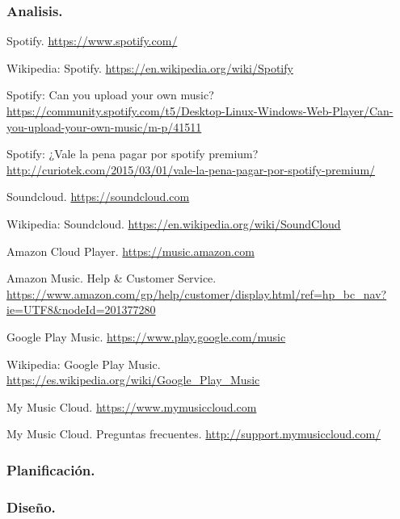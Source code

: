 \subsubsection*{Analisis.}

 Spotify. \url{https://www.spotify.com/}

 Wikipedia: Spotify. \url{https://en.wikipedia.org/wiki/Spotify}

 Spotify: Can you upload your own music? \url{https://community.spotify.com/t5/Desktop-Linux-Windows-Web-Player/Can-you-upload-your-own-music/m-p/41511}

 Spotify: ¿Vale la pena pagar por spotify premium? \url{http://curiotek.com/2015/03/01/vale-la-pena-pagar-por-spotify-premium/}

 Soundcloud. \url{https://soundcloud.com}

 Wikipedia: Soundcloud. \url{https://en.wikipedia.org/wiki/SoundCloud}

 Amazon Cloud Player. \url{https://music.amazon.com}

 Amazon Music. Help & Customer Service. \url{https://www.amazon.com/gp/help/customer/display.html/ref=hp_bc_nav?ie=UTF8&nodeId=201377280}

 Google Play Music. \url{https://www.play.google.com/music}

 Wikipedia: Google Play Music. \url{https://es.wikipedia.org/wiki/Google_Play_Music}

 My Music Cloud. \url{https://www.mymusiccloud.com}

 My Music Cloud. Preguntas frecuentes. \url{http://support.mymusiccloud.com/}


\subsubsection*{Planificación.}

\subsubsection*{Diseño.}

